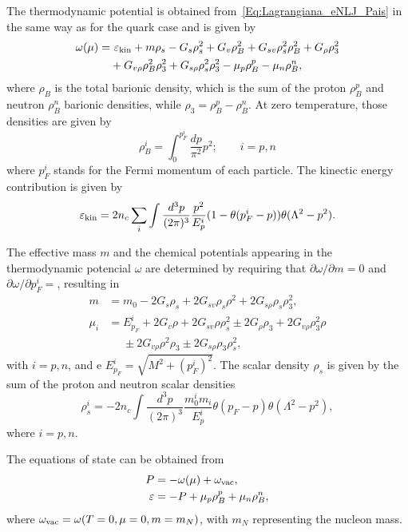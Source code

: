 \documentclass[prc, reprint, amsmath, floatfix,10pt]{revtex4-1}
\begin{document}
The thermodynamic potential is obtained from~\eqref{Eq:Lagrangiana_eNLJ_Pais} in the same way as for the quark case and is given by
\begin{equation}\label{Eq:potencial_termodinamico}
\begin{split}
	\omega(\mu) =&~ \varepsilon_{\rm{kin}} + m\rho_s - G_s\rho_s^2 + G_v\rho_B^2 + G_{sv}\rho_s^2\rho_B^2 + G_\rho\rho_3^2 \\
	&+ G_{v\rho}\rho_B^2\rho_3^2 + G_{s\rho}\rho_s^2\rho_3^2 - \mu_p\rho_B^p - \mu_n\rho_B^n,
\end{split}
\end{equation}
%
where $\rho_B$ is the total barionic density, which is the sum of the proton $\rho_B^p$ and neutron $\rho_B^n$ barionic densities, while $\rho_3 = \rho_B^p - \rho_B^n$. At zero temperature, those densities are given by
\begin{equation}
	\rho_B^i = \int_0^{p_F^i}\frac{dp}{\pi^2}p^2; \qquad i = p,n
\end{equation}
%
where $p_F^i$ stands for the Fermi momentum of each particle. The kinectic energy contribution is given by
\begin{equation}
	\varepsilon_{\rm{kin}} = 2 n_c \sum_i \int \frac{d^3p}{(2\pi)^3}\frac{p^2}{E_p^i}(1 - \theta(p_F^i - p))\theta(\Lambda^2 - p^2).
\end{equation}

The effective mass $m$ and the chemical potentials appearing in the thermodynamic potencial $\omega$ are determined by requiring that $\partial\omega/\partial m = 0$ and $\partial\omega/\partial p_F^i = $, resulting in
\begin{align}\label{Eq:Gap}
	m &= m_0 - 2G_s\rho_s + 2G_{sv}\rho_s\rho^2 + 2 G_{s\rho}\rho_s\rho_3^2 ,\\
	\mu_i &= E_{p_F}^i + 2G_v\rho + 2G_{sv}\rho\rho_s^2 \pm 2G_\rho\rho_3+2G_{v\rho}\rho_3^2\rho \nonumber \\
	&\phantom{=} \pm 2G_{v\rho}\rho^2\rho_3 \pm 2 G_{s\rho}\rho_3\rho_s^2,
\end{align}
%
with $i = p,n$, and e $E_{p_F}^i = \sqrt{M^2 + (p_F^i)^2}$. The scalar
density $\rho_s$ is given by the sum of the proton and neutron scalar densities
\begin{equation}
	\rho_s^i = - 2 n_c \int \frac{d^3p}{(2\pi)^3}\frac{m_0^i m_i}{E_p^i}\theta(p_F - p)\theta(\Lambda^2 - p^2),
\end{equation}
%
where $i = p, n$.

The equations of state can be obtained from
\begin{align}
	P &= -\omega(\mu) + \omega_{\rm{vac}} ,\\
	\varepsilon &= -P + \mu_p \rho_B^p + \mu_n \rho_B^n,
\end{align}
%
where $\omega_{\rm{vac}} = \omega(T = 0, \mu = 0, m = m_N)$, with $m_N$ representing the nucleon mass. 
\end{document}
